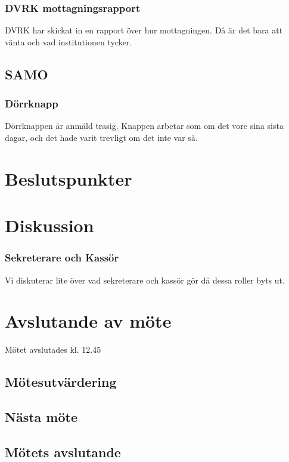 \documentclass[protokoll]{dvd}
\begin{document}
\subsubsection*{DVRK mottagningsrapport}
    DVRK har skickat in en rapport över hur mottagningen. Då är det bara att vänta och vad
    institutionen tycker.

\newpage




\subsection{SAMO}
    \subsubsection*{Dörrknapp}
    Dörrknappen är anmäld trasig. Knappen arbetar som om det vore sina sista dagar, och det hade
    varit trevligt om det inte var så.

\section{Beslutspunkter}

\section{Diskussion}

\subsubsection*{Sekreterare och Kassör}
Vi diskuterar lite över vad sekreterare och kassör gör då dessa roller byts ut.

\section{Avslutande av möte}
Mötet avslutades kl. 12.45

\subsection{Mötesutvärdering}

\subsection{Nästa möte}

\subsection{Mötets avslutande}

\styrelsesignaturer
\end{document}
